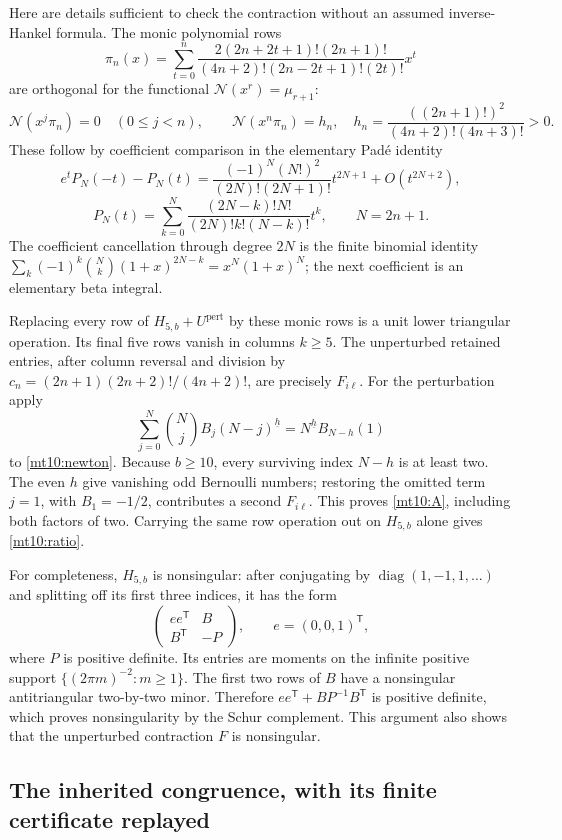 \documentclass[11pt,a4paper]{article}
\numberwithin{equation}{section}
\theoremstyle{definition}
\theoremstyle{remark}
\begin{document}
Here are details sufficient to check the contraction without an
assumed inverse-Hankel formula. The monic polynomial rows
\[
 \pi_n(x)=\sum_{t=0}^n
 \frac{2(2n+2t+1)!(2n+1)!}
 {(4n+2)!(2n-2t+1)!(2t)!}x^t
\]
are orthogonal for the functional $\mathcal N(x^r)=\mu_{r+1}$:
\[
 \mathcal N(x^j\pi_n)=0\quad(0\le j<n),\qquad
 \mathcal N(x^n\pi_n)=h_n,
 \quad h_n=\frac{((2n+1)!)^2}{(4n+2)!(4n+3)!}>0.
\]
These follow by coefficient comparison in the elementary Pad\'e identity
\[
 e^tP_N(-t)-P_N(t)
 =\frac{(-1)^N(N!)^2}{(2N)!(2N+1)!}t^{2N+1}
        +O(t^{2N+2}),
\]
\[
 P_N(t)=\sum_{k=0}^N
       \frac{(2N-k)!N!}{(2N)!k!(N-k)!}t^k,
 \qquad N=2n+1.
\]
The coefficient cancellation through degree $2N$ is the finite binomial
identity $\sum_k(-1)^k\binom Nk(1+x)^{2N-k}=x^N(1+x)^N$;
the next coefficient is an elementary beta integral.

Replacing every row of $H_{5,b}+U^{\mathrm{pert}}$ by these monic
rows is a unit lower triangular operation. Its final five rows vanish
in columns $k\ge5$. The unperturbed retained entries, after column
reversal and division by
$c_n=(2n+1)(2n+2)!/(4n+2)!$, are precisely $F_{i\ell}$.
For the perturbation apply
\[
 \sum_{j=0}^N\binom Nj B_j(N-j)^{\underline h}
                  =N^{\underline h}B_{N-h}(1)
\]
to \eqref{mt10:newton}. Because $b\ge10$, every surviving index
$N-h$ is at least two. The even $h$ give vanishing odd Bernoulli
numbers; restoring the omitted term $j=1$, with $B_1=-1/2$, contributes
a second $F_{i\ell}$. This proves \eqref{mt10:A}, including both
factors of two. Carrying the same row operation out on $H_{5,b}$
alone gives \eqref{mt10:ratio}.

For completeness, $H_{5,b}$ is nonsingular: after conjugating by
$\operatorname{diag}(1,-1,1,\ldots)$ and splitting off its first
three indices, it has the form
\[
 \begin{pmatrix}ee^{\mathsf T}&B\\B^{\mathsf T}&-P\end{pmatrix},
 \qquad e=(0,0,1)^{\mathsf T},
\]
where $P$ is positive definite. Its entries are moments on the infinite
positive support $\{(2\pi m)^{-2}:m\ge1\}$. The first two rows
of $B$ have a nonsingular antitriangular two-by-two minor. Therefore
$ee^{\mathsf T}+BP^{-1}B^{\mathsf T}$ is positive definite, which
proves nonsingularity by the Schur complement. This argument also
shows that the unperturbed contraction $F$ is nonsingular.

\subsection{The inherited congruence, with its finite certificate replayed}
\end{document}
